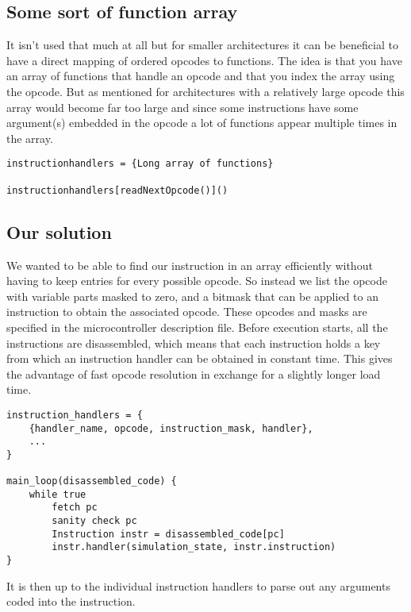 \subsection{Some sort of function array}
It isn't used that much at all but for smaller architectures it can be beneficial 
to have a direct mapping of ordered opcodes to functions. The idea is that 
you have an array of functions that handle an
opcode and that you index the array using the opcode. But as mentioned
for architectures with a relatively large opcode this array would
become far too large and since some instructions have some argument(s)
embedded in the opcode a lot of functions appear multiple times in the array.

\lstset{caption=Example opcode parsing using a function array}
\begin{lstlisting}
instructionhandlers = {Long array of functions}

instructionhandlers[readNextOpcode()]()

\end{lstlisting}

\subsection{Our solution}
We wanted to be able to find our instruction in an array efficiently without
having to keep entries for every possible opcode. So instead we list the
opcode with variable parts masked to zero, and a bitmask that can be applied
to an instruction to obtain the associated opcode. These opcodes and masks are
specified in the microcontroller description file. Before execution starts,
all the instructions are disassembled, which means that each instruction holds
a key from which an instruction handler can be obtained in constant time. This gives the advantage of fast opcode resolution in exchange for a slightly longer load time.
\lstset{caption=An example of our opcode parsing solution}
\begin{lstlisting}
instruction_handlers = {
    {handler_name, opcode, instruction_mask, handler},
    ...
}

main_loop(disassembled_code) {
    while true
        fetch pc
        sanity check pc
        Instruction instr = disassembled_code[pc]
        instr.handler(simulation_state, instr.instruction)
}

\end{lstlisting}

It is then up to the individual instruction handlers to parse out any
arguments coded into the instruction.


